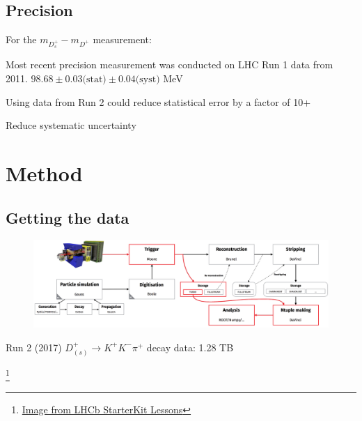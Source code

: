\documentclass{beamer}%
\newcommand\blfootnote[1]{%
  \begingroup
  \renewcommand\thefootnote{}\footnote{#1}%
  \addtocounter{footnote}{-1}%
  \endgroup
}
\begin{document}
  \subsection{Precision}
  \begin{frame}

    {\Large For the $m_{D^+_s} - m_{D^+}$ measurement:}
    \vspace{0.5em}
\begin{itemize}
\setlength\itemsep{1.1em}
{\large
\item Most recent precision measurement was conducted on LHC Run 1 data from 2011\cite{lhcb}. $98.68 \pm 0.03\text{(stat)} \pm 0.04\text{(syst)}$ MeV
\item Using data from Run 2 could reduce statistical error by a factor of 10+
}
\item Reduce systematic uncertainty 
\end{itemize}

\end{frame}


\section{Method}

\subsection{Getting the data}

\begin{frame}

\begin{figure}
\includegraphics[width=1.0\linewidth]{lhcb_run_2_data_flow.png}
\end{figure}
{\Large \begin{center}
Run 2 (2017) $D^{+}_{(s)} \rightarrow K^{+}K^{-}\pi^{+}$ decay data: 1.28 TB


\blfootnote{\href{https://lhcb.github.io/starterkit-lessons/first-analysis-steps/run-2-data-flow.html}{Image from LHCb StarterKit Lessons}}
\end{center}}

\end{frame}
\end{document}
